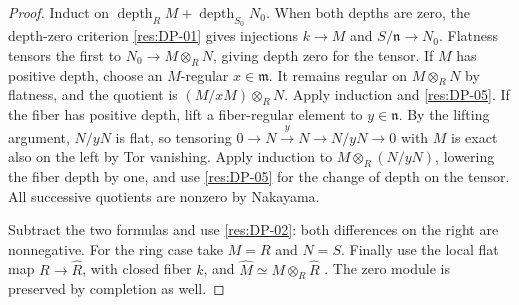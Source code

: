 \documentclass[11pt,oneside,openany]{book}
\theoremstyle{definition}
\theoremstyle{remark}
\begin{document}
\begin{proof}
Induct on $\operatorname{depth}_R M+\operatorname{depth}_{S_0}N_0$.
When both depths are zero, the depth-zero criterion
\ref{res:DP-01} gives injections $k\to M$ and
$S/\mathfrak n\to N_0$. Flatness tensors the first to
$N_0\to M\otimes_R N$, giving depth zero for the tensor.
If $M$ has positive depth, choose an $M$-regular
$x\in\mathfrak m$. It remains regular on $M\otimes_R N$
by flatness, and the quotient is $(M/xM)\otimes_R N$.
Apply induction and \ref{res:DP-05}. If the fiber has
positive depth, lift a fiber-regular element to $y\in\mathfrak n$.
By the lifting argument, $N/yN$ is flat, so tensoring
$0\to N\xrightarrow{y}N\to N/yN\to0$ with $M$ is exact
also on the left by Tor vanishing. Apply induction to
$M\otimes_R(N/yN)$, lowering the fiber depth by one, and
use \ref{res:DP-05} for the change of depth on the tensor.
All successive quotients are nonzero by Nakayama.

Subtract the two formulas and use \ref{res:DP-02}:
both differences on the right are nonnegative. For the
ring case take $M=R$ and $N=S$. Finally use the local flat
map $R\to\widehat R$, with closed fiber $k$, and
$\widehat M\simeq M\otimes_R\widehat R$
\cite[Theorems ALG-05-C04-R03 and ALG-05-C04-S01]{p103}.
The zero module is preserved by completion as well.
\end{proof}
\end{document}
